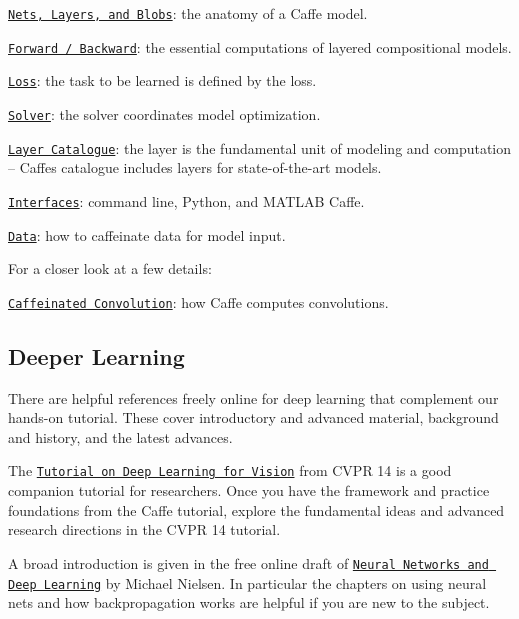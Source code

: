 \begin{DoxyItemize}
\item \href{net_layer_blob.html}{\tt Nets, Layers, and Blobs}\+: the anatomy of a Caffe model.
\item \href{forward_backward.html}{\tt Forward / Backward}\+: the essential computations of layered compositional models.
\item \href{loss.html}{\tt Loss}\+: the task to be learned is defined by the loss.
\item \href{solver.html}{\tt Solver}\+: the solver coordinates model optimization.
\item \href{layers.html}{\tt Layer Catalogue}\+: the layer is the fundamental unit of modeling and computation -- Caffe\textquotesingle{}s catalogue includes layers for state-\/of-\/the-\/art models.
\item \href{interfaces.html}{\tt Interfaces}\+: command line, Python, and M\+A\+T\+L\+AB Caffe.
\item \href{data.html}{\tt Data}\+: how to caffeinate data for model input.
\end{DoxyItemize}

For a closer look at a few details\+:


\begin{DoxyItemize}
\item \href{convolution.html}{\tt Caffeinated Convolution}\+: how Caffe computes convolutions.
\end{DoxyItemize}

\subsection*{Deeper Learning}

There are helpful references freely online for deep learning that complement our hands-\/on tutorial. These cover introductory and advanced material, background and history, and the latest advances.

The \href{https://sites.google.com/site/deeplearningcvpr2014/}{\tt Tutorial on Deep Learning for Vision} from C\+V\+PR \textquotesingle{}14 is a good companion tutorial for researchers. Once you have the framework and practice foundations from the Caffe tutorial, explore the fundamental ideas and advanced research directions in the C\+V\+PR \textquotesingle{}14 tutorial.

A broad introduction is given in the free online draft of \href{http://neuralnetworksanddeeplearning.com/index.html}{\tt Neural Networks and Deep Learning} by Michael Nielsen. In particular the chapters on using neural nets and how backpropagation works are helpful if you are new to the subject.

